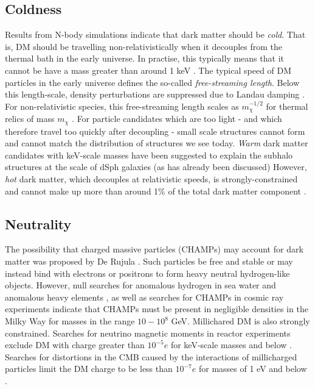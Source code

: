 \subsection{Coldness}

Results from N-body simulations indicate that dark matter should be \textit{cold}. That is, DM should be travelling non-relativistically when it decouples from the thermal bath in the early universe.  In practise, this typically means that it cannot be have a mass greater than around 1 keV \cite{Narayanan:2000}.   The typical speed of DM particles in the early universe defines the so-called \textit{free-streaming length}. Below this length-scale, density perturbations are suppressed due to Landau damping \cite{Bond:1983}. For non-relativistic species, this free-streaming length scales as $m_\chi^{-1/2}$ for thermal relics of mass $m_\chi$ \cite{Boyanovsky:2008} . For particle candidates which are too light - and which therefore travel too quickly after decoupling - small scale structures cannot form and cannot match the distribution of structures we see today.  \textit{Warm} dark matter candidates with keV-scale masses have been suggested to explain the subhalo structures at the scale of dSph galaxies (as has already been discussed) However, \textit{hot} dark matter, which decouples at relativistic speeds, is strongly-constrained and cannot make up more than around 1\% of the total dark matter component \cite{Abazajian:2005, dePutter:2012}.

\subsection{Neutrality}

The possibility that charged massive particles (CHAMPs) may account for dark matter was proposed by De Rujula \etal \cite{DeRujula:1990}. Such particles be free and stable or may instead bind with electrons or positrons to form heavy neutral hydrogen-like objects. However, null searches for anomalous hydrogen in sea water \cite{Kudo:2001} and anomalous heavy elements \cite{Hemmick:1990}, as well as searches for CHAMPs in cosmic ray experiments \cite{Perl:2001} indicate that CHAMPs must be present in negligible densities in the Milky Way for masses in the range $10-10^8$ GeV.   Millichared DM is also strongly constrained. Searches for neutrino magnetic moments in reactor experiments exclude DM with charge greater than $10^{-5} e$ for keV-scale masses and below \cite{Gninenko:2007}. Searches for distortions in the CMB caused by the interactions of millicharged particles limit the DM charge to be less than $10^{-7} e$ for masses of 1 eV and below \cite{Melchiorri:2007}.

